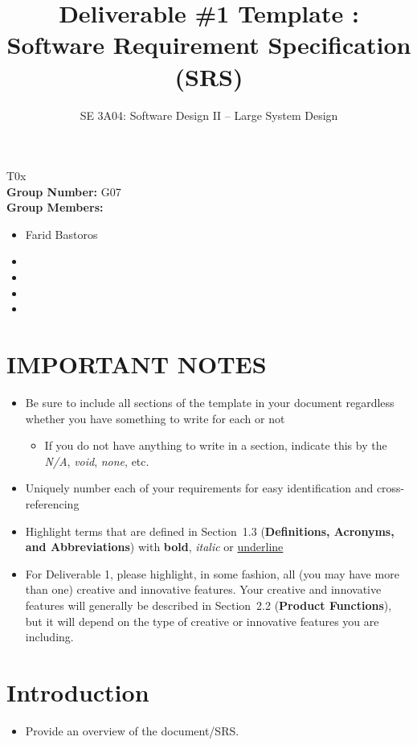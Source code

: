 \documentclass[]{article}
\title{Deliverable \#1 Template : Software Requirement Specification (SRS)}
\author{SE 3A04: Software Design II -- Large System Design}
\date{}
\begin{document}
\maketitle	
{} T0x\\
{\bf Group Number:} G07 \\
{\bf Group Members:} 
\begin{itemize}
	\item Farid Bastoros 
	\item 
	\item 
	\item
	\item  
\end{itemize}

\section*{IMPORTANT NOTES}
\begin{itemize}
	\item Be sure to include all sections of the template in your document regardless whether you have something to write for each or not
	\begin{itemize}
		\item If you do not have anything to write in a section, indicate this by the \emph{N/A}, \emph{void}, \emph{none}, etc.
	\end{itemize}
	\item Uniquely number each of your requirements for easy identification and cross-referencing
	\item Highlight terms that are defined in Section~1.3 (\textbf{Definitions, Acronyms, and Abbreviations}) with \textbf{bold}, \emph{italic} or \underline{underline}
	\item For Deliverable 1, please highlight, in some fashion, all (you may have more than one) creative and innovative features. Your creative and innovative features will generally be described in Section~2.2 (\textbf{Product Functions}), but it will depend on the type of creative or innovative features you are including.
\end{itemize}

\newpage
\section{Introduction}
\label{sec:introduction}

\begin{itemize}
	\item Provide an overview of the document/SRS.
\end{itemize}
\end{document}
